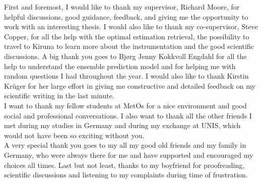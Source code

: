
\begin{acknowledgement}   
	\noindent
	First and foremost, I would like to thank my supervisor, Richard Moore, for helpful discussions, good guidance, feedback, and giving me the opportunity to work with an interesting thesis. I would also like to thank my co-supervisor, Steve Copper, for all the help with the optimal estimation retrieval, the possibility to travel to Kiruna to learn more about the instrumentation and the good scientific discussions. A big thank you goes to Bj\o rg Jenny Kokkvoll Engdahl for all the help to understand the ensemble prediction model and for helping me with random questions I had throughout the year. I would also like to thank Kirstin Kr\"uger for her large effort in giving me constructive and detailed feedback on my scientific writing in the last minute. 
	\\
	I want to thank my fellow students at MetOs for a nice environment and good social and professional conversations. I also want to thank all the other friends I met during my studies in Germany and during my exchange at UNIS, which would not have been so exciting without you.
	\\
	A very special thank you goes to my all my good old friends and my family in Germany, who were always there for me and have supported and encouraged my choices all times. Last but not least, thanks to my boyfriend for proofreading, scientific discussions and listening to my complaints during time of frustration.
\end{acknowledgement}
